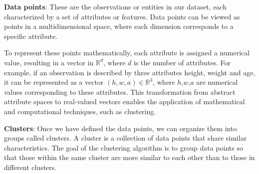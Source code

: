 \noindent \textbf{Data points}: These are the observations or entities in our dataset, each characterized by a set of attributes or features. Data points can be viewed as points in a multidimensional space, where each dimension corresponds to a specific attribute. \begin{toReview}To represent these points mathematically, each attribute is assigned a numerical value, resulting in a vector in $\mathbb{R}^d$, where $d$ is the number of attributes. For example, if an observation is described by three attributes height, weight and age, it can be represented as a vector $(h,w,a)\in\mathbb{R}^3$, where $h$,$w$,$a$ are numerical values corresponding to these attributes. This transformation from abstract attribute spaces to real-valued vectors enables the application of mathematical and computational techniques, such as clustering.\end{toReview}

\noindent \textbf{Clusters}: Once we have defined the data points, we can organize them into groups called clusters. A cluster is a collection of data points that share similar characteristics. The goal of the clustering algorithm is to group data points so that those within the same cluster are more similar to each other than to those in different clusters.

